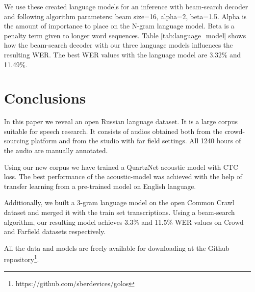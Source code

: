 \documentclass[a4paper]{article}
\begin{document}
We use these created language models for an inference with beam-search decoder and following algorithm parameters: beam size=16, alpha=2, beta=1.5. Alpha is the amount of importance to place on the N-gram language model. Beta is a penalty term given to longer word sequences. Table \ref{tab:language_model} shows how the beam-search decoder with our three language models influences the resulting WER. The best WER values with the language model are 3.32\% and 11.49\%. 


\section{Conclusions}

In this paper we reveal an open Russian language dataset. It is a large corpus suitable for speech research. It consists of audios obtained both from the crowd-sourcing platform and from the studio with far field settings. All 1240 hours of the audio are manually annotated.

Using our new corpus we have trained a QuartzNet acoustic model with CTC loss. The best performance of the acoustic-model was achieved with the help of transfer learning from a pre-trained model on English language. 

Additionally, we built a 3-gram language model on the open Common Crawl dataset and merged it with the train set transcriptions. Using a beam-search algorithm, our resulting model achieves 3.3\% and 11.5\% WER values on Crowd and Farfield datasets respectively.

All the data and models are freely available for downloading at the Github repository\footnote{https://github.com/sberdevices/golos}.







\end{document}
